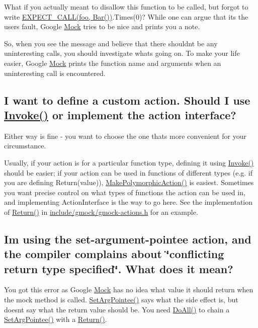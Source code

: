 What if you actually meant to disallow this function to be called, but forgot to write {\ttfamily \hyperlink{gmock-spec-builders_8h_a535a6156de72c1a2e25a127e38ee5232}{E\+X\+P\+E\+C\+T\+\_\+\+C\+A\+L\+L(foo, Bar())}.Times(0)}? While one can argue that it\textquotesingle{}s the user\textquotesingle{}s fault, Google \hyperlink{class_mock}{Mock} tries to be nice and prints you a note.

So, when you see the message and believe that there shouldn\textquotesingle{}t be any uninteresting calls, you should investigate what\textquotesingle{}s going on. To make your life easier, Google \hyperlink{class_mock}{Mock} prints the function name and arguments when an uninteresting call is encountered.

\subsection*{I want to define a custom action. Should I use \hyperlink{namespacetesting_a12aebaf8363d49a383047529f798b694}{Invoke()} or implement the action interface?}

Either way is fine -\/ you want to choose the one that\textquotesingle{}s more convenient for your circumstance.

Usually, if your action is for a particular function type, defining it using {\ttfamily \hyperlink{namespacetesting_a12aebaf8363d49a383047529f798b694}{Invoke()}} should be easier; if your action can be used in functions of different types (e.\+g. if you are defining {\ttfamily Return(value)}), {\ttfamily \hyperlink{namespacetesting_a36bd06c5ea972c6df0bd9f40a7a94c65}{Make\+Polymorphic\+Action()}} is easiest. Sometimes you want precise control on what types of functions the action can be used in, and implementing {\ttfamily Action\+Interface} is the way to go here. See the implementation of {\ttfamily \hyperlink{namespacetesting_af6d1c13e9376c77671e37545cd84359c}{Return()}} in {\ttfamily \hyperlink{gmock-actions_8h}{include/gmock/gmock-\/actions.\+h}} for an example.

\subsection*{I\textquotesingle{}m using the set-\/argument-\/pointee action, and the compiler complains about \char`\"{}conflicting return type specified\char`\"{}. What does it mean?}

You got this error as Google \hyperlink{class_mock}{Mock} has no idea what value it should return when the mock method is called. {\ttfamily \hyperlink{namespacetesting_a5740a5033b88c37666fcd09a269d123f}{Set\+Arg\+Pointee()}} says what the side effect is, but doesn\textquotesingle{}t say what the return value should be. You need {\ttfamily \hyperlink{namespacetesting_a5f533932753d2af95000e96c4a3042e3}{Do\+All()}} to chain a {\ttfamily \hyperlink{namespacetesting_a5740a5033b88c37666fcd09a269d123f}{Set\+Arg\+Pointee()}} with a {\ttfamily \hyperlink{namespacetesting_af6d1c13e9376c77671e37545cd84359c}{Return()}}.


